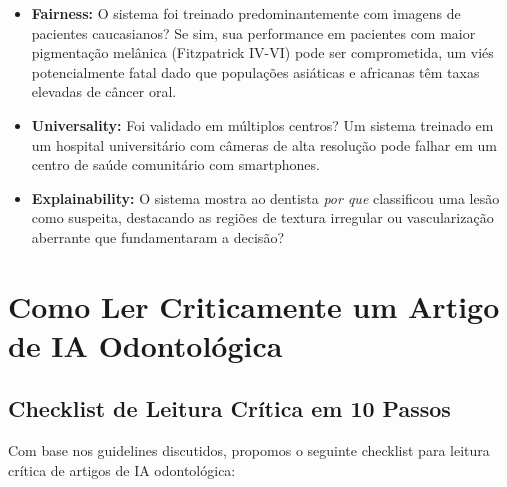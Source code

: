 \begin{itemize}
    \item \textbf{Fairness:} O sistema foi treinado predominantemente com imagens de pacientes caucasianos? Se sim, sua performance em pacientes com maior pigmentação melânica (Fitzpatrick IV-VI) pode ser comprometida, um viés potencialmente fatal dado que populações asiáticas e africanas têm taxas elevadas de câncer oral.
    \item \textbf{Universality:} Foi validado em múltiplos centros? Um sistema treinado em um hospital universitário com câmeras de alta resolução pode falhar em um centro de saúde comunitário com smartphones.
    \item \textbf{Explainability:} O sistema mostra ao dentista \textit{por que} classificou uma lesão como suspeita, destacando as regiões de textura irregular ou vascularização aberrante que fundamentaram a decisão?
\end{itemize}

\section{Como Ler Criticamente um Artigo de IA Odontológica}

\subsection{Checklist de Leitura Crítica em 10 Passos}

Com base nos guidelines discutidos, propomos o seguinte checklist para leitura crítica de artigos de IA odontológica:


